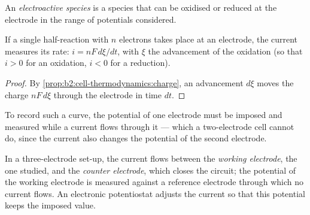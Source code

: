 \begin{definition}\label{def:b2:current-potential-curves:electroactive}
An \emph{electroactive species} is a species
that can be oxidised or reduced at the electrode in the range of potentials
considered.
\end{definition}

\begin{proposition}\label{prop:b2:current-potential-curves:current-rate}
If a single half-reaction with $n$ electrons takes place at an electrode, the
current measures its rate: $i = nF\,d\xi/dt$, with $\xi$ the advancement of
the oxidation (so that $i > 0$ for an oxidation, $i < 0$ for a reduction).
\end{proposition}

\begin{proof}
By \cref{prop:b2:cell-thermodynamics:charge}, an advancement $d\xi$ moves the
charge $nF\,d\xi$ through the electrode in time $dt$.
\end{proof}

To record such a curve, the potential of one electrode must be imposed and
measured while a current flows through it --- which a two-electrode cell
cannot do, since the current also changes the potential of the second
electrode.

\begin{definition}\label{def:b2:current-potential-curves:set-up}
In a three-electrode set-up, the current flows between the \emph{working
electrode}, the one studied, and the \emph{counter
electrode}, which closes the circuit; the potential
of the working electrode is measured against a reference electrode through
which no current flows. An electronic potentiostat adjusts the current so
that this potential keeps the imposed value.
\end{definition}

